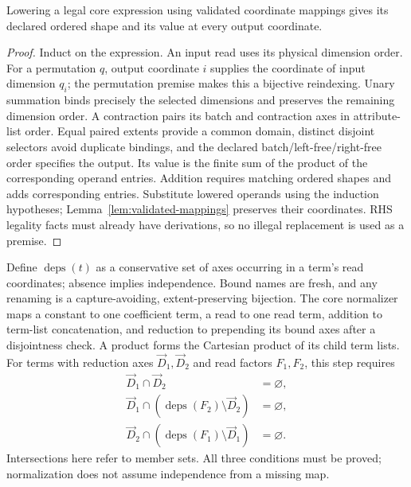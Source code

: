 \begin{lemma}
\label{lem:core-lowering}
Lowering a legal core expression using validated coordinate mappings gives
its declared ordered shape and its value at every output coordinate.
\end{lemma}
\begin{proof}
Induct on the expression. An input read uses its physical dimension order.
For a permutation $q$, output coordinate $i$ supplies the coordinate of
input dimension $q_i$; the permutation premise makes this a bijective
reindexing. Unary summation binds precisely the selected dimensions and
preserves the remaining dimension order. A contraction pairs its batch and
contraction axes in attribute-list order. Equal paired extents provide a
common domain, distinct disjoint selectors avoid duplicate bindings, and
the declared batch/left-free/right-free order specifies the output. Its
value is the finite sum of the product of the corresponding operand
entries. Addition requires matching ordered shapes and adds corresponding
entries. Substitute lowered operands using the induction hypotheses;
Lemma~\ref{lem:validated-mappings} preserves their coordinates. RHS
legality facts must already have derivations, so no illegal replacement is
used as a premise.
\end{proof}

Define $\operatorname{deps}(t)$ as a conservative set of axes occurring in
a term's read coordinates; absence implies independence. Bound names are
fresh, and any renaming is a capture-avoiding, extent-preserving bijection.
The core normalizer maps a constant to one coefficient term, a read to one
read term, addition to term-list concatenation, and reduction to prepending
its bound axes after a disjointness check. A product forms the Cartesian
product of its child term lists. For terms with reduction axes $\vec D_1,\vec D_2$
and read factors $F_1,F_2$, this step requires
\begin{equation}
\begin{aligned}
 \vec D_1\cap \vec D_2&=\varnothing,\\
 \vec D_1\cap(\operatorname{deps}(F_2)\setminus \vec D_2)&=\varnothing,\\
 \vec D_2\cap(\operatorname{deps}(F_1)\setminus \vec D_1)&=\varnothing.
\end{aligned}
\end{equation}
Intersections here refer to member sets. All three conditions must be
proved; normalization does not assume independence from a missing map.

